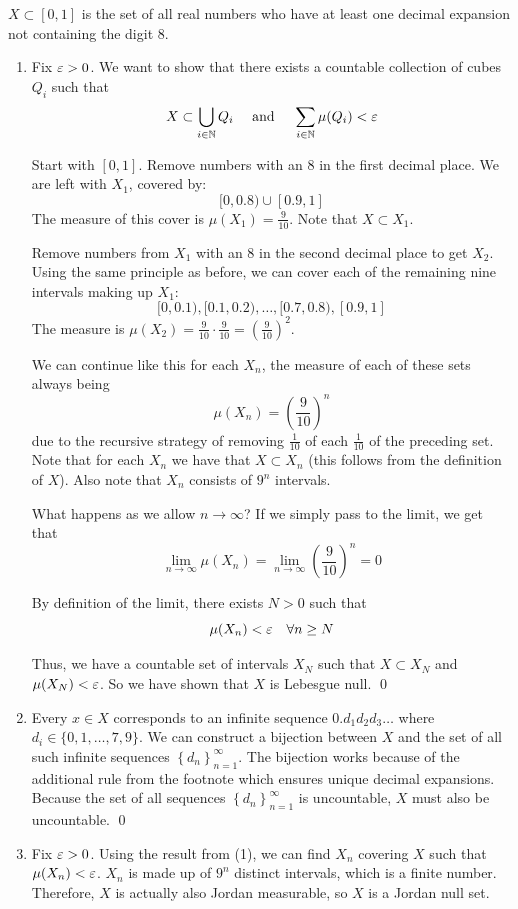 \documentclass[12pt]{article}
\begin{document}
$X \subset [0, 1]$ is the set of all real numbers who have at least one decimal expansion not containing the digit 8.

\begin{enumerate}
    \item Fix $\varepsilon > 0$. We want to show that there exists a countable collection of cubes $Q_i$ such that
    $$
        X \subset \bigcup\limits_{i \in \mathbb{N}} Q_i \quad \text{ and } \quad \sum_{i \in \mathbb{N}} \mu(Q_i) < \varepsilon
    $$

    Start with $[0, 1]$. Remove numbers with an 8 in the first decimal place. We are left with $X_1$, covered by:
    \[ [0, 0.8) \cup [0.9, 1] \]
    The measure of this cover is $\mu(X_1) = \frac{9}{10}$. Note that $X \subset X_1$.

    Remove numbers from $X_1$ with an 8 in the second decimal place to get $X_2$. Using the same principle as before, we can cover each of the remaining nine intervals making up $X_1$:
    \[ [0, 0.1), [0.1, 0.2), \dots, [0.7, 0.8), [0.9, 1] \]
    The measure is $\mu(X_2) = \frac{9}{10} \cdot \frac{9}{10} = (\frac{9}{10})^2$.

    We can continue like this for each $X_n$, the measure of each of these sets always being
    $$
        \mu(X_n) = (\frac{9}{10})^n
    $$
    due to the recursive strategy of removing $\frac{1}{10}$ of each $\frac{1}{10}$ of the preceding set. Note that for each $X_n$ we have that $X \subset X_n$ (this follows from the definition of $X$). Also note that $X_n$ consists of $9^n$ intervals.

    What happens as we allow $n \rightarrow \infty$? If we simply pass to the limit, we get that
    $$
        \lim_{n \rightarrow \infty} \mu(X_n) = \lim_{n \rightarrow \infty} (\frac{9}{10})^n = 0
    $$

    By definition of the limit, there exists $N > 0$ such that
    $$
        \mu(X_n) < \varepsilon \quad \forall n \geq N
    $$

    Thus, we have a countable set of intervals $X_N$ such that $X \subset X_N$ and $\mu(X_N) < \varepsilon$. So we have shown that $X$ is Lebesgue null. \qed

    \item Every $x \in X$ corresponds to an infinite sequence $0.d_1d_2d_3\dots$ where $d_i \in \{0, 1,\dots,7,9\}$. We can construct a bijection between $X$ and the set of all such infinite sequences $\left\{d_n\right\}_{n = 1}^{\infty}$. The bijection works because of the additional rule from the footnote which ensures unique decimal expansions. Because the set of all sequences $\left\{d_n\right\}_{n = 1}^{\infty}$ is uncountable, $X$ must also be uncountable. \qed
    \item Fix $\varepsilon > 0$. Using the result from (1), we can find $X_n$ covering $X$ such that $\mu(X_n) < \varepsilon$. $X_n$ is made up of $9^n$ distinct intervals, which is a finite number. Therefore, $X$ is actually also Jordan measurable, so $X$ is a Jordan null set.
    

\end{enumerate}
\end{document}
